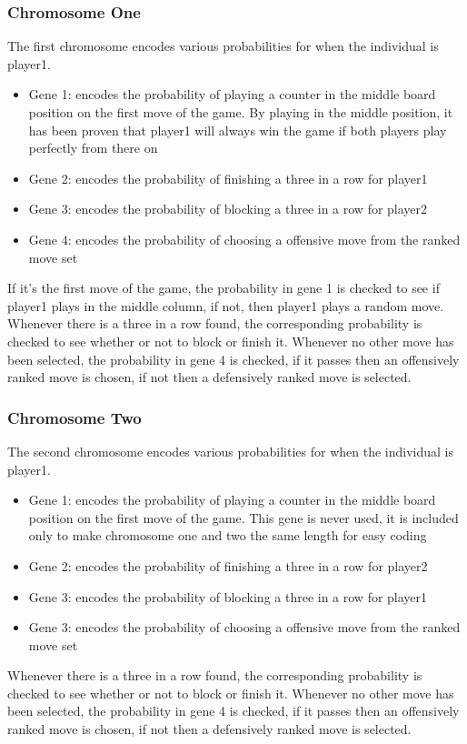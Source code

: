 \subsubsection{Chromosome One}
The first chromosome encodes various probabilities for when the individual is player1.
\begin{itemize}
  \item{Gene 1: encodes the probability of playing a counter in the middle board position on the first move of the game. By playing in the middle position, it has been proven that player1 will always win the game if both players play perfectly from there on\cite{connect4}}
  \item{Gene 2: encodes the probability of finishing a three in a row for player1}
  \item{Gene 3: encodes the probability of blocking a three in a row for player2}
  \item{Gene 4: encodes the probability of choosing a offensive move from the ranked move set}
\end{itemize}
If it's the first move of the game, the probability in gene 1 is checked to see if player1 plays in the middle column, if not, then player1 plays a random move. Whenever there is a three in a row found, the corresponding probability is checked to see whether or not to block or finish it. Whenever no other move has been selected, the probability in gene 4 is checked, if it passes then an offensively ranked move is chosen, if not then a defensively ranked move is selected.

\subsubsection{Chromosome Two}
The second chromosome encodes various probabilities for when the individual is player1.
\begin{itemize}
  \item{Gene 1: encodes the probability of playing a counter in the middle board position on the first move of the game. This gene is never used, it is included only to make chromosome one and two the same length for easy coding}
  \item{Gene 2: encodes the probability of finishing a three in a row for player2}
  \item{Gene 3: encodes the probability of blocking a three in a row for player1}
  \item{Gene 3: encodes the probability of choosing a offensive move from the ranked move set}
\end{itemize}
Whenever there is a three in a row found, the corresponding probability is checked to see whether or not to block or finish it. Whenever no other move has been selected, the probability in gene 4 is checked, if it passes then an offensively ranked move is chosen, if not then a defensively ranked move is selected.

